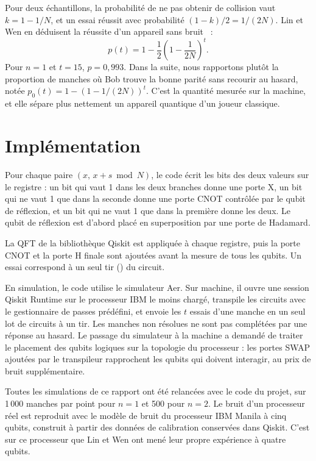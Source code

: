Pour deux échantillons, la probabilité de ne pas obtenir
de collision vaut $k = 1 - 1/N$, et un essai réussit avec
probabilité $(1-k)/2 = 1/(2N)$. Lin et Wen en déduisent
la réussite d'un appareil sans bruit~\cite{linwen} :
\begin{equation}\label{e:p}
p(t) = 1 - \frac12\left(1 - \frac{1}{2N}\right)^{t}.
\end{equation}
Pour $n = 1$ et $t = 15$, $p = 0{,}993$. Dans la suite, nous
rapportons plutôt la proportion de manches où Bob
trouve la bonne parité sans recourir au hasard, notée
$p_0(t) = 1 - (1 - 1/(2N))^t$. C'est la quantité mesurée sur
la machine, et elle sépare plus nettement un appareil
quantique d'un joueur classique.

\section{Implémentation}\label{s:impl}
 Pour chaque paire
$(x,\, x + s \bmod N)$, le code écrit les bits des deux valeurs
sur le registre : un bit qui vaut 1 dans les deux branches
donne une porte X, un bit qui ne vaut 1 que dans la
seconde donne une porte CNOT contrôlée par le qubit
de réflexion, et un bit qui ne vaut 1 que dans la première
donne les deux. Le qubit de réflexion est d'abord placé
en superposition par une porte de Hadamard.

 La QFT de la bibliothèque Qiskit est
appliquée à chaque registre, puis la porte CNOT et la
porte H finale sont ajoutées avant la mesure de tous les
qubits. Un essai correspond à un seul tir () du circuit.

 En simulation, le code utilise le simulateur
Aer. Sur machine, il ouvre une session Qiskit Runtime sur
le processeur IBM le moins chargé, transpile les circuits
avec le gestionnaire de passes prédéfini, et envoie les $t$
essais d'une manche en un seul lot de circuits à un tir.
Les manches non résolues ne sont pas complétées par
une réponse au hasard. Le passage du simulateur à la
machine a demandé de traiter le placement des qubits
logiques sur la topologie du processeur : les portes SWAP
ajoutées par le transpileur rapprochent les qubits qui
doivent interagir, au prix de bruit supplémentaire.

 Toutes les simulations de ce rapport
ont été relancées avec le code du projet, sur 1\,000 manches
par point pour $n = 1$ et 500 pour $n = 2$. Le bruit d'un
processeur réel est reproduit avec le modèle de bruit du
processeur IBM Manila à cinq qubits, construit à partir
des données de calibration conservées dans Qiskit. C'est
sur ce processeur que Lin et Wen ont mené leur propre
expérience à quatre qubits.

